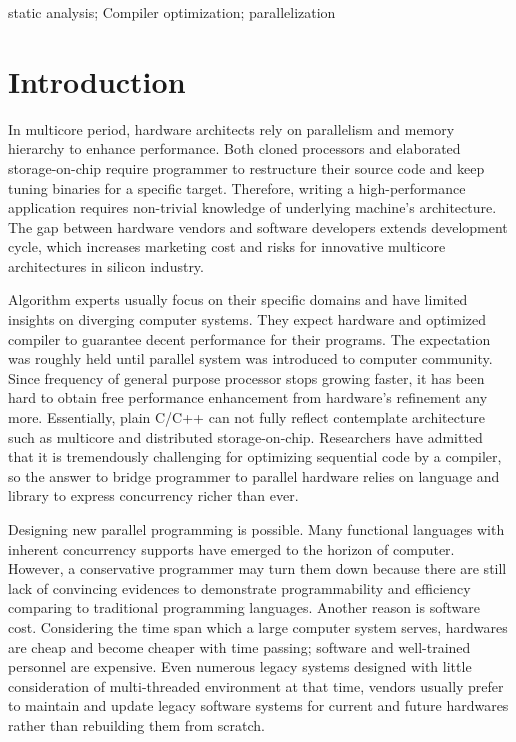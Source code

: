 \documentclass[10pt, conference, compsocconf]{IEEEtran}
\begin{document}
\begin{IEEEkeywords}
static analysis; Compiler optimization; parallelization
\end{IEEEkeywords}


%
\IEEEpeerreviewmaketitle

\section{Introduction}
In multicore period, hardware architects rely on parallelism and memory hierarchy to enhance performance. Both cloned processors and elaborated storage-on-chip require programmer to restructure their source code and keep tuning binaries for a specific target. Therefore, writing a high-performance application requires non-trivial knowledge of underlying machine's architecture. The gap between hardware vendors and software developers extends development cycle, which increases marketing cost and risks for innovative multicore architectures in silicon industry.

Algorithm experts usually focus on their specific domains and have limited insights on diverging computer systems. They expect hardware and optimized compiler to guarantee decent performance for their programs. The expectation was roughly held until parallel system was introduced to computer community. Since frequency of general purpose processor stops growing faster, it has been hard to obtain free performance enhancement from hardware's refinement any more. Essentially, plain C/C++ can not fully reflect contemplate architecture such as multicore and distributed storage-on-chip. Researchers have admitted that it is tremendously challenging for optimizing sequential code by a compiler, so the answer to bridge programmer to parallel hardware relies on language and library to express concurrency richer than ever.

Designing new parallel programming is possible. Many functional languages \cite{b13} with inherent concurrency supports have emerged to the horizon of computer. However, a conservative programmer may turn them down because there are still lack of convincing evidences to demonstrate programmability and efficiency comparing to traditional programming languages. Another reason is software cost. Considering the time span which a large computer system serves, hardwares are cheap and become cheaper with time passing; software and well-trained personnel are expensive. Even numerous legacy systems designed with little consideration of multi-threaded environment at that time, vendors usually prefer to maintain and update legacy software systems for current and future hardwares rather than rebuilding them from scratch. 
\end{document}
